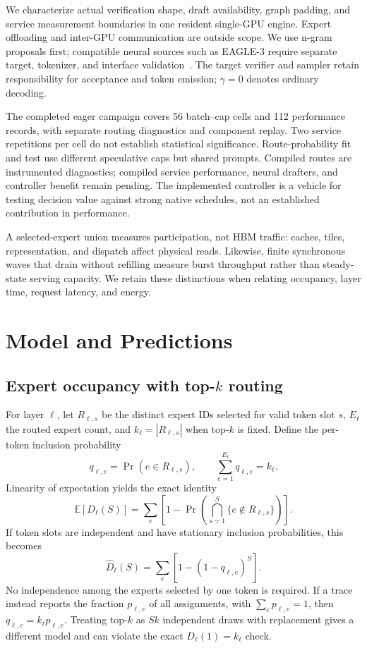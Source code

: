 \documentclass[conference,letterpaper]{IEEEtran}
\begin{document}
We characterize actual verification shape, draft availability, graph padding, and service measurement boundaries in one resident single-GPU engine. Expert offloading and inter-GPU communication are outside scope. We use n-gram proposals first; compatible neural sources such as EAGLE-3 require separate target, tokenizer, and interface validation~\cite{eagle3,eaglerepo}. The target verifier and sampler retain responsibility for acceptance and token emission; $\gamma=0$ denotes ordinary decoding.

The completed eager campaign covers 56 batch--cap cells and 112 performance records, with separate routing diagnostics and component replay. Two service repetitions per cell do not establish statistical significance. Route-probability fit and test use different speculative caps but shared prompts. Compiled routes are instrumented diagnostics; compiled service performance, neural drafters, and controller benefit remain pending. The implemented controller is a vehicle for testing decision value against strong native schedules, not an established contribution in performance.

A selected-expert union measures participation, not HBM traffic: caches, tiles, representation, and dispatch affect physical reads. Likewise, finite synchronous waves that drain without refilling measure burst throughput rather than steady-state serving capacity. We retain these distinctions when relating occupancy, layer time, request latency, and energy.

\section{Model and Predictions}
\subsection{Expert occupancy with top-\texorpdfstring{$k$}{k} routing}
For layer $\ell$, let $R_{\ell,s}$ be the distinct expert IDs selected for valid token slot $s$, $E_\ell$ the routed expert count, and $k_\ell=|R_{\ell,s}|$ when top-$k$ is fixed. Define the per-token inclusion probability
\begin{equation}
q_{\ell,e}=\Pr(e\in R_{\ell,s}),\qquad
\sum_{e=1}^{E_\ell}q_{\ell,e}=k_\ell.
\end{equation}
Linearity of expectation yields the exact identity
\begin{equation}
\mathbb E[D_\ell(S)] = \sum_e\left[1-\Pr\!\left(\bigcap_{s=1}^{S}\{e\notin R_{\ell,s}\}\right)\right].
\end{equation}
If token slots are independent and have stationary inclusion probabilities, this becomes
\begin{equation}\label{eq:d}
\widehat D_\ell(S)=\sum_e[1-(1-q_{\ell,e})^S].
\end{equation}
No independence among the experts selected by one token is required. If a trace instead reports the fraction $p_{\ell,e}$ of all assignments, with $\sum_e p_{\ell,e}=1$, then $q_{\ell,e}=k_\ell p_{\ell,e}$. Treating top-$k$ as $Sk$ independent draws with replacement gives a different model and can violate the exact $D_\ell(1)=k_\ell$ check.
\end{document}
